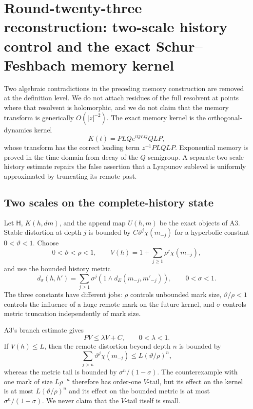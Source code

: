 \section{Round-twenty-three reconstruction: two-scale history control and the exact Schur--Feshbach memory kernel}
\label{sec:r23-a4}

Two algebraic contradictions in the preceding memory construction are removed
at the definition level.  We do not attach residues of the full resolvent at
points where that resolvent is holomorphic, and we do not claim that the
memory transform is generically $O(|z|^{-2})$.  The exact memory kernel is the
orthogonal-dynamics kernel
\[
 K(t)=PLQe^{tQLQ}QLP,
\]
whose transform has the correct leading term $z^{-1}PLQLP$.  Exponential
memory is proved in the time domain from decay of the $Q$-semigroup.  A
separate two-scale history estimate repairs the false assertion that a
Lyapunov sublevel is uniformly approximated by truncating its remote past.

\subsection{Two scales on the complete-history state}

Let $\mathsf H$, $K(h,dm)$, and the append map $U(h,m)$ be the exact objects of
A3.  Stable distortion at depth $j$ is bounded by
$C\vartheta^j\chi(m_{-j})$ for a hyperbolic constant $0<\vartheta<1$.
Choose
\[
 0<\vartheta<\rho<1,
 \qquad
 V(h)=1+\sum_{j\ge1}\rho^j\chi(m_{-j}),                  \tag{A4.1}
\]
and use the bounded history metric
\[
 d_\sigma(h,h')=\sum_{j\ge1}\sigma^j
 (1\wedge d_E(m_{-j},m'_{-j})),
 \qquad 0<\sigma<1.                                      \tag{A4.2}
\]
The three constants have different jobs: $\rho$ controls unbounded mark
size, $\vartheta/\rho<1$ controls the influence of a huge remote mark on the
future kernel, and $\sigma$ controls metric truncation independently of mark
size.

A3's branch estimate gives
\[
 PV\le\lambda V+C,\qquad 0<\lambda<1.                    \tag{A4.3}
\]
If $V(h)\le L$, then the remote distortion beyond depth $n$ is bounded by
\[
 \sum_{j>n}\vartheta^j\chi(m_{-j})
 \le L(\vartheta/\rho)^n,                                \tag{A4.4}
\]
whereas the metric tail is bounded by
$\sigma^n/(1-\sigma)$.  The counterexample with one mark of size
$L\rho^{-n}$ therefore has order-one $V$-tail, but its effect on the kernel is
at most $L(\vartheta/\rho)^n$ and its effect on the bounded metric is at most
$\sigma^n/(1-\sigma)$.  We never claim that the $V$-tail itself is small.

